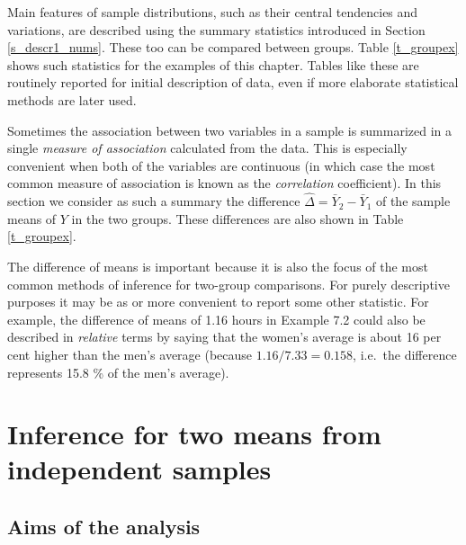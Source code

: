 Main features of sample distributions, such as their central tendencies
and variations, are described using the summary statistics introduced in
Section \ref{s_descr1_nums}. These too can be compared between groups.
Table \ref{t_groupex} shows such statistics for the examples of this
chapter. Tables like these are routinely reported for initial
description of data, even if more elaborate statistical methods are
later used.

Sometimes the association between two variables in a sample is
summarized in a single \emph{measure of association} calculated from the
data. This is especially convenient when both of the variables are
continuous (in which case the most common measure of association is
known as the \emph{correlation} coefficient). In this
section we consider as such a summary the difference
$\hat{\Delta}=\bar{Y}_{2}-\bar{Y}_{1}$ of the sample means of $Y$ in the
two groups. These differences are also shown in Table \ref{t_groupex}.

The difference of means is important because it is also the focus of the most common
methods of inference for two-group comparisons. For
purely descriptive purposes it may be as or more
convenient to report some other statistic. For example, the difference
of means of 1.16 hours in Example 7.2 could also be described in
\emph{relative} terms by saying that the women's average is about 16 per
cent higher than the men's average (because $1.16/7.33=0.158$, i.e.\ the
difference represents 15.8 \% of the men's average).

\section{Inference for two means from independent samples}
\label{s_means_inference}

\subsection{Aims of the analysis}
\label{ss_means_inference_intro}


